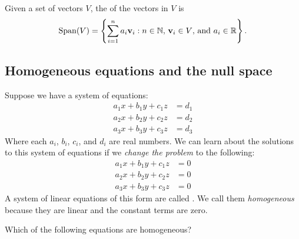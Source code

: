 \documentclass{ximera}
\begin{document}


\begin{definition}
  Given a set of vectors $V$, the  of the vectors in $V$ is
  \[
    \operatorname{Span}(V) = \left\{\sum_{i=1}^n a_i\mathbf{v}_i:\text{$n\in \mathbb N$,
      $\mathbf{v}_i\in V$, and $a_i\in \mathbb{R}$}\right\}.
  \]
\end{definition}

\subsection{Homogeneous equations and the null space}
Suppose we have a system of equations:
\begin{align*}
  a_1 x + b_1 y + c_1 z & = d_1 \\
  a_2 x + b_2 y + c_2 z & = d_2 \\
  a_3 x + b_3 y + c_3 z & = d_3
\end{align*}
Where each $a_i$, $b_i$, $c_i$, and $d_i$ are real numbers. We can
learn about the solutions to this system of equations if we
\textit{change the problem} to the following:
\begin{align*}
  a_1 x + b_1 y + c_1 z & = 0 \\
  a_2 x + b_2 y + c_2 z & = 0 \\
  a_3 x + b_3 y + c_3 z & = 0
\end{align*}
A system of linear equations of this form are called . We call
them \textit{homogeneous} because they are linear and the constant terms are
zero.

\begin{question}
  Which of the following equations are homogeneous?
  \begin{selectAll}
  \end{selectAll}
\end{question}
\end{document}
